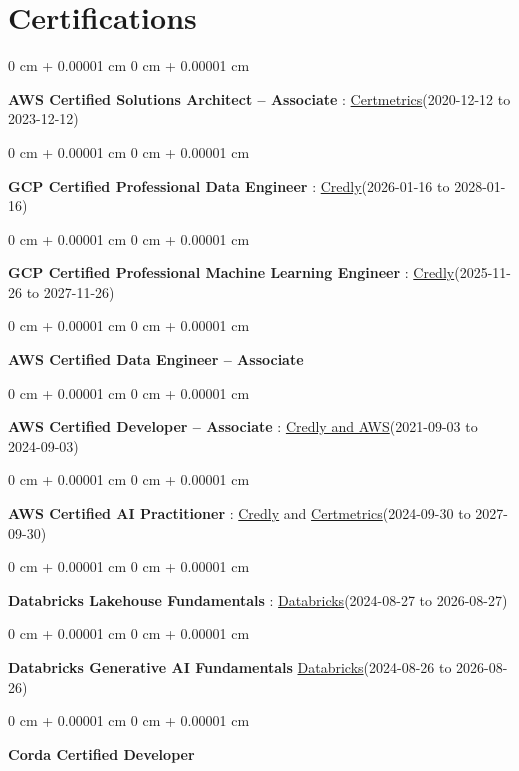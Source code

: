 \documentclass[10pt, letterpaper]{article}
\newenvironment{onecolentry}{
    \begin{adjustwidth}{
        0 cm + 0.00001 cm
    }{
        0 cm + 0.00001 cm
    }
}{
    \end{adjustwidth}
} %
\begin{document}
    \vspace{2 pt }
    \section{Certifications}
        \vspace{2 pt }
        \begin{samepage}
            \begin{onecolentry}
                \textbf{AWS Certified Solutions Architect – Associate} : \href{https://cp.certmetrics.com/amazon/en/public/verify/credential/SNBY48EBJJVE1SWX}{Certmetrics}(2020-12-12 to 2023-12-12)
            \end{onecolentry}
            \begin{onecolentry}
                \textbf{GCP Certified Professional Data Engineer} : \href{https://www.credly.com/badges/977e96d9-12e7-4f6c-b8a7-df71fb7153b8/public_url}{Credly}(2026-01-16 to 2028-01-16)
            \end{onecolentry}
            \begin{onecolentry}
                \textbf{GCP Certified Professional Machine Learning Engineer} : \href{https://www.credly.com/badges/a6965347-09ea-4d8f-b398-0e151407160d/public_url}{Credly}(2025-11-26 to 2027-11-26)
            \end{onecolentry}
            \begin{onecolentry}
                \textbf{AWS Certified Data Engineer – Associate}
            \end{onecolentry}
            \begin{onecolentry}
                \textbf{AWS Certified Developer – Associate} : \href{https://www.credly.com/badges/b8106fbd-d3d1-4204-8cdf-e708798fd582/public_url}{Credly and AWS}(2021-09-03  to 2024-09-03)
            \end{onecolentry}
            \begin{onecolentry}
                \textbf{AWS Certified AI Practitioner} : \href{https://www.credly.com/badges/451b7ba5-8be1-4a8e-bbec-ade26627a6b6/public_url}{Credly} and \href{https://cp.certmetrics.com/amazon/en/public/verify/credential/495f0d9853874bf9a33c17f8e89ce131}{Certmetrics}(2024-09-30 to 2027-09-30)
            \end{onecolentry}
            \begin{onecolentry}
                \textbf{Databricks Lakehouse Fundamentals} : \href{https://scl.io/FXGKS0u}{Databricks}(2024-08-27 to 2026-08-27)
            \end{onecolentry}
            \begin{onecolentry}
                \textbf{Databricks Generative AI Fundamentals} \href{https://sgq.io/3uIFGNi}{Databricks}(2024-08-26 to 2026-08-26)
            \end{onecolentry}
            \begin{onecolentry}
                \textbf{Corda Certified Developer}
            \end{onecolentry}
        \end{samepage}
\end{document}
